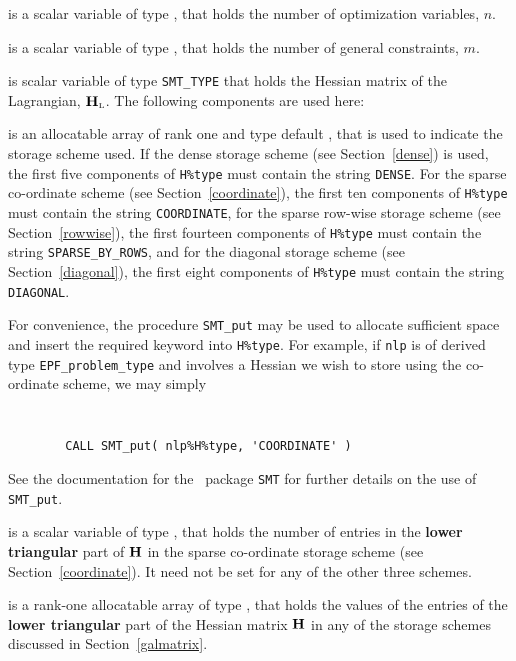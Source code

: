 \documentclass{galahad}
\newcommand{\packagename}{EPF}
\newcommand{\bmHL}{\bmH\sub{L}}
\begin{document}
\begin{description}

 is a scalar variable of type \integer,
 that holds the number of optimization variables, $n$.

 is a scalar variable of type \integer,
 that holds the number of general constraints, $m$.

 is scalar variable of type {\tt SMT\_TYPE}
that holds the Hessian matrix of the Lagrangian, $\bmHL$. 
The following components are used here:

\begin{description}

 is an allocatable array of rank one and type default
\character, that
is used to indicate the storage scheme used. If the dense storage scheme
(see Section~\ref{dense}) is used,
the first five components of {\tt H\%type} must contain the
string {\tt DENSE}.
For the sparse co-ordinate scheme (see Section~\ref{coordinate}),
the first ten components of {\tt H\%type} must contain the
string {\tt COORDINATE},
for the sparse row-wise storage scheme (see Section~\ref{rowwise}),
the first fourteen components of {\tt H\%type} must contain the
string {\tt SPARSE\_BY\_ROWS},
and for the diagonal storage scheme (see Section~\ref{diagonal}),
the first eight components of {\tt H\%type} must contain the
string {\tt DIAGONAL}.

For convenience, the procedure {\tt SMT\_put}
may be used to allocate sufficient space and insert the required keyword
into {\tt H\%type}.
For example, if {\tt nlp} is of derived type {\tt \packagename\_problem\_type}
and involves a Hessian we wish to store using the co-ordinate scheme,
we may simply
{\tt
\begin{verbatim}
        CALL SMT_put( nlp%H%type, 'COORDINATE' )
\end{verbatim}
}
\noindent
See the documentation for the \galahad\ package {\tt SMT}
for further details on the use of {\tt SMT\_put}.

 is a scalar variable of type \integer, that
holds the number of entries in the {\bf lower triangular} part of ${\mathbf{H}}$
in the sparse co-ordinate storage scheme (see Section~\ref{coordinate}).
It need not be set for any of the other three schemes.

 is a rank-one allocatable array of type \realdp, that holds
the values of the entries of the {\bf lower triangular} part
of the Hessian matrix ${\mathbf{H}}$ in any of the
storage schemes discussed in Section~\ref{galmatrix}.


\end{description}
\end{description}
\end{document}
